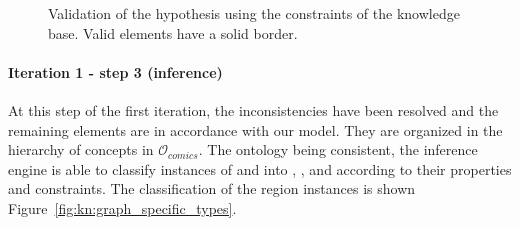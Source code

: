  \begin{figure}[!ht]  %
   \center
    \hspace{0.5em}
  \caption[Validation of the hypothesis using the constraints of the knowledge base]{Validation of the hypothesis using the constraints of the knowledge base. Valid elements have a solid border.}
  \label{fig:kn:graph_valid_initial}
 \end{figure}

\paragraph{Iteration 1 - step 3 (inference)} %
\label{par:step_3}

At this step of the first iteration, the inconsistencies have been resolved and the remaining elements are in accordance with our model.
They are organized in the hierarchy of concepts in $\mathcal{O}_{comics}$.
The ontology being consistent, the inference engine is able to classify instances of   and  into , ,  and  according to their properties and constraints.
The classification of the region instances is shown Figure~\ref{fig:kn:graph_specific_types}.

